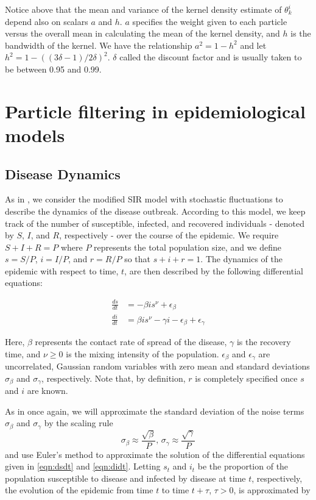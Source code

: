 \documentclass{article}
\begin{document}
Notice above that the mean and variance of the kernel density estimate of $\theta_k^i$ depend also on scalars $a$ and $h$.  $a$ specifies the weight given to each particle versus the overall mean in calculating the mean of the kernel density, and $h$ is the bandwidth of the kernel. We have the relationship $a^2 = 1 - h^2$ and let $h^2 = 1 - ((3\delta - 1)/2\delta)^2$.  $\delta$ called the discount factor and is usually taken to be between 0.95 and 0.99.


\section{Particle filtering in epidemiological models \label{sec:apply}}

\subsection{Disease Dynamics}

As in \citet{skvortsov}, we consider the modified SIR model with stochastic fluctuations to describe the dynamics of the disease outbreak.  According to this model, we keep track of the number of susceptible, infected, and recovered individuals - denoted by $S$, $I$, and $R$, respectively - over the course of the epidemic.  We require $S + I + R = P$ where $P$ represents the total population size, and we define $s = S/P$, $i = I/P$, and $r = R/P$ so that $s + i + r = 1$.  The dynamics of the epidemic with respect to time, $t$, are then described by the following differential equations:

\begin{align}
\frac{ds}{dt} &= -\beta is^\nu + \epsilon_\beta \label{eqn:dsdt} \\
\frac{di}{dt} &= \beta is^\nu - \gamma i - \epsilon_\beta + \epsilon_\gamma \label{eqn:didt}
\end{align}

\noindent Here, $\beta$ represents the contact rate of spread of the disease, $\gamma$ is the recovery time, and $\nu \ge 0$ is the mixing intensity of the population.  $\epsilon_\beta$ and $\epsilon_\gamma$ are uncorrelated, Gaussian random variables with zero mean and standard deviations $\sigma_\beta$ and $\sigma_\gamma$, respectively.  Note that, by definition, $r$ is completely specified once $s$ and $i$ are known.

As in \citet{skvortsov} once again, we will approximate the standard deviation of the noise terms $\sigma_\beta$ and $\sigma_\gamma$ by the scaling rule \[\sigma_\beta \approx \frac{\sqrt{\beta}}{P} \mbox{, } \sigma_\gamma \approx \frac{\sqrt{\gamma}}{P}\] and use Euler's method to approximate the solution of the differential equations given in \eqref{eqn:dsdt} and \eqref{eqn:didt}.  Letting $s_t$ and $i_t$ be the proportion of the population susceptible to disease and infected by disease at time $t$, respectively, the evolution of the epidemic from time $t$ to time $t + \tau$, $\tau > 0$, is approximated by
\end{document}
